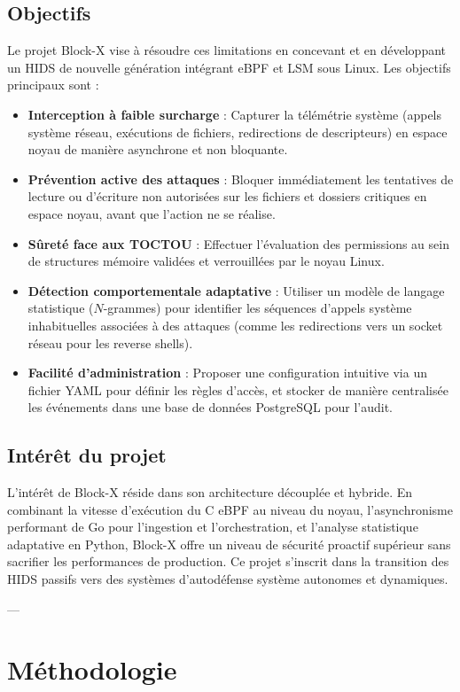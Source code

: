 \documentclass[11pt,a4paper]{article}
\begin{document}
\subsection{Objectifs}
Le projet Block-X vise à résoudre ces limitations en concevant et en développant un HIDS de nouvelle génération intégrant eBPF et LSM sous Linux. Les objectifs principaux sont :
\begin{itemize}
    \item \textbf{Interception à faible surcharge} : Capturer la télémétrie système (appels système réseau, exécutions de fichiers, redirections de descripteurs) en espace noyau de manière asynchrone et non bloquante.
    \item \textbf{Prévention active des attaques} : Bloquer immédiatement les tentatives de lecture ou d'écriture non autorisées sur les fichiers et dossiers critiques en espace noyau, avant que l'action ne se réalise.
    \item \textbf{Sûreté face aux TOCTOU} : Effectuer l'évaluation des permissions au sein de structures mémoire validées et verrouillées par le noyau Linux.
    \item \textbf{Détection comportementale adaptative} : Utiliser un modèle de langage statistique ($N$-grammes) pour identifier les séquences d'appels système inhabituelles associées à des attaques (comme les redirections vers un socket réseau pour les reverse shells).
    \item \textbf{Facilité d'administration} : Proposer une configuration intuitive via un fichier YAML pour définir les règles d'accès, et stocker de manière centralisée les événements dans une base de données PostgreSQL pour l'audit.
\end{itemize}

\subsection{Intérêt du projet}
L'intérêt de Block-X réside dans son architecture découplée et hybride. En combinant la vitesse d'exécution du C eBPF au niveau du noyau, l'asynchronisme performant de Go pour l'ingestion et l'orchestration, et l'analyse statistique adaptative en Python, Block-X offre un niveau de sécurité proactif supérieur sans sacrifier les performances de production. Ce projet s'inscrit dans la transition des HIDS passifs vers des systèmes d'autodéfense système autonomes et dynamiques.

---

\section{Méthodologie}
\end{document}
